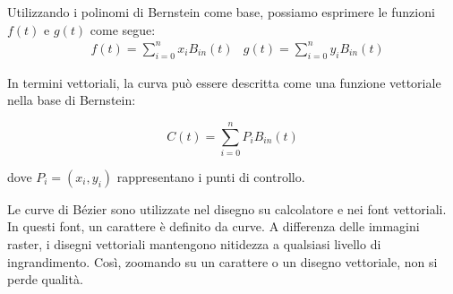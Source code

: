 \documentclass{article}
\numberwithin{equation}{section}
\begin{document}
Utilizzando i polinomi di Bernstein come base, possiamo esprimere le funzioni
\( f(t) \) e \( g(t) \) come segue:
\begin{equation*}
    \begin{aligned}
        &f(t)=\displaystyle\sum_{i=0}^{n}x_iB_{in}(t)
        &g(t)=\displaystyle\sum_{i=0}^{n} y_iB_{in}(t) 
    \end{aligned} 
\end{equation*}

In termini vettoriali, la curva può essere descritta come una funzione
vettoriale nella base di Bernstein:

$$C(t) = \sum_{i=0}^{n} P_i B_{in}(t)$$

dove \(P_i = (x_i, y_i)\) rappresentano i punti di controllo.

Le curve di Bézier sono utilizzate nel disegno su calcolatore e nei font
vettoriali. In questi font, un carattere è definito da curve. A differenza
delle immagini raster, i disegni vettoriali mantengono nitidezza a qualsiasi
livello di ingrandimento. Così, zoomando su un carattere o un disegno
vettoriale, non si perde qualità.
\newpage
\end{document}
